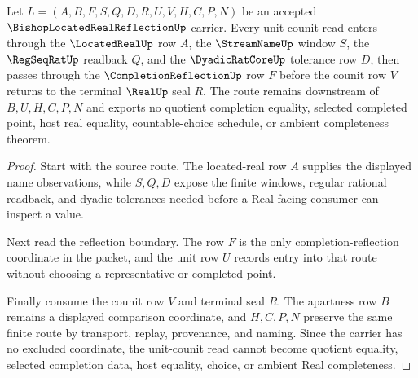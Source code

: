 \begin{theorem}
\label{thm:bishop-located-real-reflection-unit-counit-route}
Let $L=(A,B,F,S,Q,D,R,U,V,H,C,P,N)$ be an accepted $\BishopLocatedRealReflectionUp$ carrier. Every unit-counit read enters through the $\LocatedRealUp$ row $A$, the $\StreamNameUp$ window $S$, the $\RegSeqRatUp$ readback $Q$, and the $\DyadicRatCoreUp$ tolerance row $D$, then passes through the $\CompletionReflectionUp$ row $F$ before the counit row $V$ returns to the terminal $\RealUp$ seal $R$. The route remains downstream of $B,U,H,C,P,N$ and exports no quotient completion equality, selected completed point, host real equality, countable-choice schedule, or ambient completeness theorem.
\end{theorem}
\begin{proof}
Start with the source route. The located-real row $A$ supplies the displayed name observations, while $S,Q,D$ expose the finite windows, regular rational readback, and dyadic tolerances needed before a Real-facing consumer can inspect a value.

Next read the reflection boundary. The row $F$ is the only completion-reflection coordinate in the packet, and the unit row $U$ records entry into that route without choosing a representative or completed point.

Finally consume the counit row $V$ and terminal seal $R$. The apartness row $B$ remains a displayed comparison coordinate, and $H,C,P,N$ preserve the same finite route by transport, replay, provenance, and naming. Since the carrier has no excluded coordinate, the unit-counit read cannot become quotient equality, selected completion data, host equality, choice, or ambient Real completeness.
\end{proof}


\begin{closurestatus}{\BishopLocatedRealReflectionUp}
  \theoryclosure{\seedClosure}
  \formalstatus{\unformalizedV}
\end{closurestatus}
